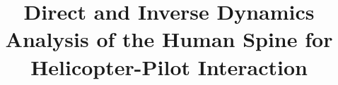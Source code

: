 %
%
%
%
%
%
\RequirePackage{fix-cm}
%
\documentclass[smallextended]{svjour3}       %
%
\smartqed  %
%

\usepackage{amsmath}

\usepackage{graphicx}
\def\gfxdir{./gfx/}


\usepackage{comment}
\usepackage{color}

%
%
%
%
%


\title{Direct and Inverse Dynamics Analysis of the Human Spine for
       Helicopter-Pilot Interaction}


